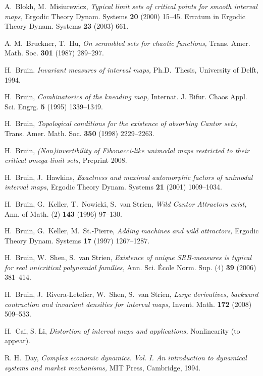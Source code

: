 \documentclass[12pt, psamsfonts, reqno]{amsart}
\begin{document}
\begin{thebibliography}{BKNS}
A.\ Blokh, M.\ Misiurewicz, {\em Typical limit sets of critical
points for smooth interval maps,} Ergodic Theory Dynam. Systems
{\bf 20} (2000) 15--45. Erratum in Ergodic Theory Dynam. Systems
{\bf 23} (2003) 661.

 A. M.\ Bruckner, T.\ Hu, {\em On scrambled sets for chaotic
functions,} Trans. Amer. Math. Soc. {\bf 301} (1987) 289--297.

 H.\ Bruin.
{\em Invariant measures of interval maps,}
Ph.D.~Thesis, University of Delft, 1994.

 H.\ Bruin,
{\em Combinatorics of the kneading map,} Internat. J. Bifur. Chaos
Appl. Sci. Engrg. {\bf 5} (1995) 1339--1349.

 H.\ Bruin,
{\em Topological conditions for the existence of absorbing Cantor
sets,} Trans. Amer. Math. Soc. {\bf 350}  (1998) 2229--2263.

 H.\ Bruin,
{\em (Non)invertibility of Fibonacci-like unimodal maps restricted
to their critical omega-limit sets,} Preprint 2008.

 H.\ Bruin, J.\ Hawkins,
{\em  Exactness and maximal automorphic factors of unimodal
interval maps,} Ergodic Theory Dynam. Systems {\bf 21} (2001)
1009--1034.

 H.\ Bruin, G.\ Keller, T.\ Nowicki, S.\ van Strien,
{\em Wild Cantor Attractors exist,} Ann. of Math. (2) {\bf 143}
(1996) 97--130.

  H.\ Bruin, G.\ Keller, M.\ St.-Pierre,
{\em Adding machines and wild attractors,} Ergodic Theory Dynam.
Systems {\bf 17} (1997) 1267--1287.

 H.\ Bruin, W.\ Shen, S.\ van Strien,
{\em Existence of unique SRB-measures is typical for real
unicritical polynomial families,}  Ann. Sci. \'Ecole Norm. Sup.
(4) {\bf 39} (2006) 381--414.

 H.\ Bruin, J.\ Rivera-Letelier, W.\ Shen, S.\ van Strien,
{\em Large derivatives, backward contraction and invariant
densities for interval maps,} Invent. Math. {\bf 172} (2008)
509--533.

 H.\ Cai, S. Li,
{\em Distortion of interval maps and applications,} Nonlinearity
(to appear).

 R. H.\ Day, {\em Complex economic dynamics. Vol. I. An introduction
to dynamical systems and market mechanisms,} MIT Press, Cambridge,
1994.


\end{thebibliography}
\end{document}
